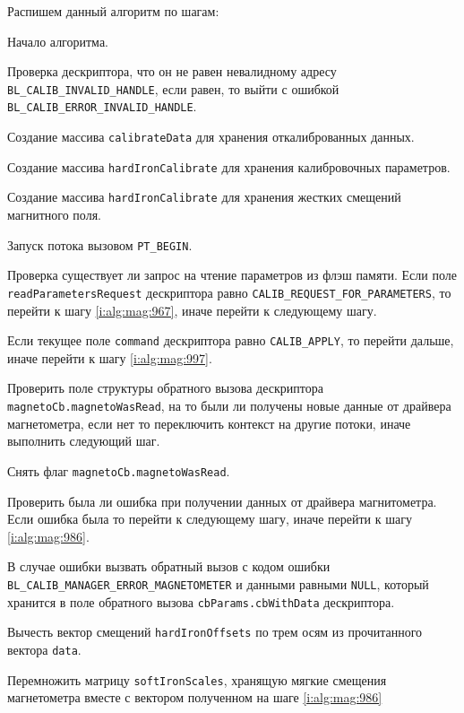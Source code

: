 Распишем данный алгоритм по шагам:
\begin{enumerate_step}
    \item Начало алгоритма.
    \item Проверка дескриптора, что он не равен невалидному адресу \lstinline|BL_CALIB_INVALID_HANDLE|, если равен, то выйти с ошибкой
    \lstinline|BL_CALIB_ERROR_INVALID_HANDLE|.
    \item Создание массива \lstinline|calibrateData| для хранения откалиброванных данных.
    \item Создание массива \lstinline|hardIronCalibrate| для хранения калибровочных параметров.
    \item Создание массива \lstinline|hardIronCalibrate| для хранения жестких смещений магнитного поля.
    \item Запуск потока вызовом \lstinline|PT_BEGIN|.
    \item \label{i:alg:mag:965} Проверка существует ли запрос на чтение параметров из флэш памяти. Если поле \lstinline|readParametersRequest| дескриптора равно \lstinline|CALIB_REQUEST_FOR_PARAMETERS|,
    то перейти к шагу \ref{i:alg:mag:967}, иначе перейти к следующему шагу.
    \item \label{i:alg:mag:974} Если текущее поле \lstinline|command| дескриптора равно \lstinline|CALIB_APPLY|, то перейти дальше, иначе перейти к шагу
    \ref{i:alg:mag:997}.
    \item Проверить поле структуры обратного вызова дескриптора \lstinline|magnetoCb.magnetoWasRead|, на то были ли получены новые данные от драйвера магнетометра, 
    если нет то переключить контекст на другие потоки, иначе выполнить следующий шаг.
    \item Снять флаг \lstinline|magnetoCb.magnetoWasRead|.
    \item Проверить была ли ошибка при получении данных от драйвера магнитометра. Если ошибка была то перейти к следующему шагу, иначе перейти к шагу \ref{i:alg:mag:986}.
    \item В случае ошибки вызвать обратный вызов с кодом ошибки \lstinline|BL_CALIB_MANAGER_ERROR_MAGNETOMETER| и данными равными \lstinline|NULL|,
    который хранится в поле обратного вызова \lstinline|cbParams.cbWithData| дескриптора.
    \item \label{i:alg:mag:986} Вычесть вектор смещений \lstinline|hardIronOffsets| по трем осям из прочитанного вектора \lstinline|data|.
    \item \label{i:alg:mag:991} Перемножить матрицу \lstinline|softIronScales|, хранящую мягкие смещения магнетометра вместе с вектором полученном на шаге \ref{i:alg:mag:986}

\end{enumerate_step}
